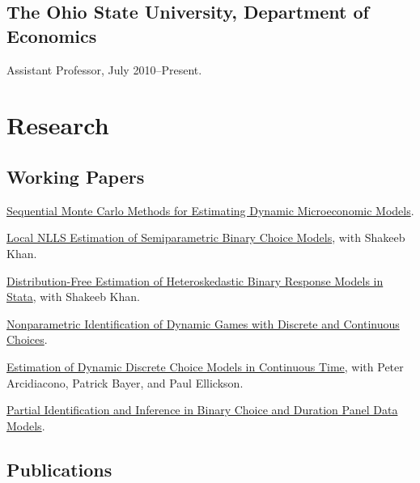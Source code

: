 \documentclass[10pt,letterpaper]{article}
\renewenvironment{itemize}{
  \begin{list}{}{
    \setlength{\leftmargin}{1.5em}
    \setlength{\itemsep}{0.25em}
    \setlength{\parskip}{0pt}
    \setlength{\parsep}{0.25em}
  }
}{
  \end{list}
}
\begin{document}
\subsection*{The Ohio State University, Department of Economics}

\begin{itemize}

\item Assistant Professor, July 2010--Present.

\end{itemize}

\section*{Research}

\subsection*{Working Papers}

\begin{itemize}

\item \href{http://jblevins.org/research/smcdmm}{Sequential Monte Carlo Methods for Estimating Dynamic Microeconomic Models}.

\item \href{http://jblevins.org/research/lnlls}{Local NLLS Estimation of Semiparametric Binary Choice Models},
  with Shakeeb Khan.

\item \href{http://jblevins.org/research/dfbr}{Distribution-Free Estimation of Heteroskedastic Binary Response Models in Stata},
  with Shakeeb Khan.

\item \href{http://jblevins.org/research/dcident}{Nonparametric Identification of Dynamic Games with Discrete and Continuous Choices}.

\item \href{http://jblevins.org/research/abbe}{Estimation of Dynamic Discrete Choice Models in Continuous Time},
  with Peter Arcidiacono, Patrick Bayer, and Paul Ellickson.

\item \href{http://jblevins.org/research/panel}{Partial Identification and Inference in Binary Choice and Duration Panel Data Models}.

\end{itemize}

\subsection*{Publications}
\end{document}
